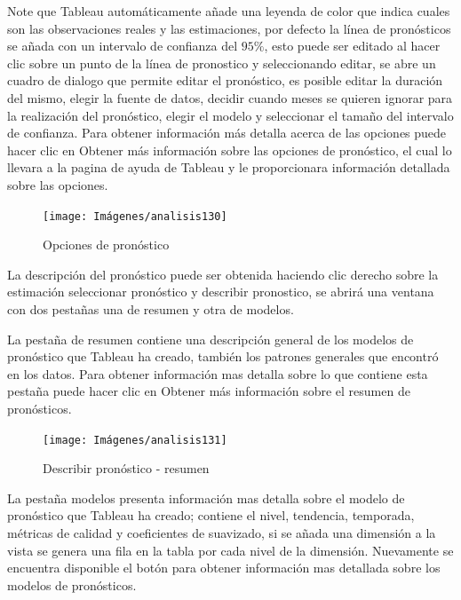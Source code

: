\documentclass[
]{book}
\begin{document}
Note que Tableau automáticamente añade una leyenda de color que indica cuales son las observaciones reales y las estimaciones, por defecto la línea de pronósticos se añada con un intervalo de confianza del \(95\%\), esto puede ser editado al hacer clic sobre un punto de la línea de pronostico y seleccionando editar, se abre un cuadro de dialogo que permite editar el pronóstico, es posible editar la duración del mismo, elegir la fuente de datos, decidir cuando meses se quieren ignorar para la realización del pronóstico, elegir el modelo y seleccionar el tamaño del intervalo de confianza. Para obtener información más detalla acerca de las opciones puede hacer clic en Obtener más información sobre las opciones de pronóstico, el cual lo llevara a la pagina de ayuda de Tableau y le proporcionara información detallada sobre las opciones.

\begin{figure}

{\centering \texttt{[image: Imágenes/analisis130]} 

}

\caption{Opciones de pronóstico}\label{fig:opcionespronosticos-fig}
\end{figure}

La descripción del pronóstico puede ser obtenida haciendo clic derecho sobre la estimación seleccionar pronóstico y describir pronostico, se abrirá una ventana con dos pestañas una de resumen y otra de modelos.

La pestaña de resumen contiene una descripción general de los modelos de pronóstico que Tableau ha creado, también los patrones generales que encontró en los datos. Para obtener información mas detalla sobre lo que contiene esta pestaña puede hacer clic en Obtener más información sobre el resumen de pronósticos.

\begin{figure}

{\centering \texttt{[image: Imágenes/analisis131]} 

}

\caption{Describir pronóstico - resumen}\label{fig:resumenpronosticos-fig}
\end{figure}

La pestaña modelos presenta información mas detalla sobre el modelo de pronóstico que Tableau ha creado; contiene el nivel, tendencia, temporada, métricas de calidad y coeficientes de suavizado, si se añada una dimensión a la vista se genera una fila en la tabla por cada nivel de la dimensión. Nuevamente se encuentra disponible el botón para obtener información mas detallada sobre los modelos de pronósticos.
\end{document}
